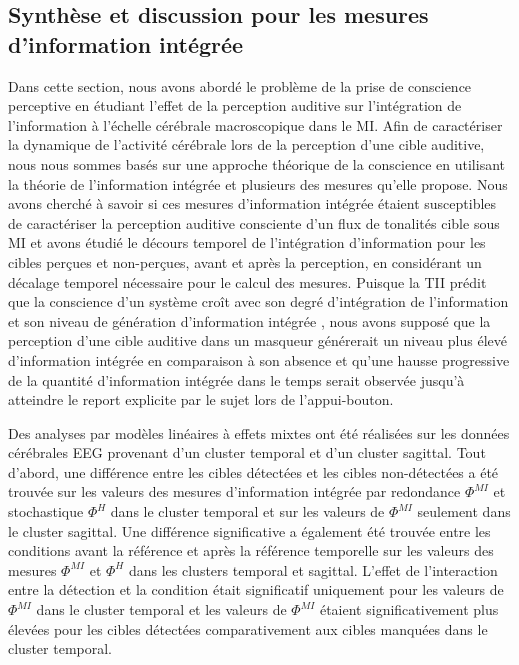 \subsection{Synthèse et discussion pour les mesures d'information intégrée}
\label{synthesediscussionmesurestii}

Dans cette section, nous avons abordé le problème de la prise de conscience perceptive en étudiant l'effet de la perception auditive sur l'intégration de l'information à l'échelle cérébrale macroscopique dans le MI. 
Afin de caractériser la dynamique de l'activité cérébrale lors de la perception d'une cible auditive, nous nous sommes basés sur une approche théorique de la conscience en utilisant la théorie de l'information intégrée et plusieurs des mesures qu'elle propose. 
Nous avons cherché à savoir si ces mesures d’information intégrée étaient susceptibles de caractériser la perception auditive consciente d’un flux de tonalités cible sous MI et avons étudié le décours temporel de l’intégration d’information pour les cibles perçues et non-perçues, avant et après la perception, en considérant un décalage temporel nécessaire pour le calcul des mesures. 
Puisque la TII prédit que la conscience d'un système croît avec son degré d'intégration de l'information et son niveau de génération d'information intégrée \citep{oizumi2014phenomenology, tononi2012integrated, tononi2015integrated, tononi2015consciousness}, nous avons supposé que la perception d'une cible auditive dans un masqueur générerait un niveau plus élevé d'information intégrée en comparaison à son absence et qu'une hausse progressive de la quantité d'information intégrée dans le temps serait observée jusqu'à atteindre le report explicite par le sujet lors de l'appui-bouton.

Des analyses par modèles linéaires à effets mixtes ont été réalisées sur les données cérébrales EEG provenant d'un cluster temporal et d'un cluster sagittal.
Tout d'abord, une différence entre les cibles détectées et les cibles non-détectées a été trouvée sur les valeurs des mesures d'information intégrée par redondance $\Phi^{MI}$ et stochastique $\Phi^{H}$ dans le cluster temporal et sur les valeurs de $\Phi^{MI}$ seulement dans le cluster sagittal. 
Une différence significative a également été trouvée entre les conditions avant la référence et après la référence temporelle sur les valeurs des mesures $\Phi^{MI}$ et $\Phi^{H}$ dans les clusters temporal et sagittal. 
L'effet de l'interaction entre la détection et la condition était significatif uniquement pour les valeurs de $\Phi^{MI}$ dans le cluster temporal et les valeurs de $\Phi^{MI}$ étaient significativement plus élevées pour les cibles détectées comparativement aux cibles manquées dans le cluster temporal.


